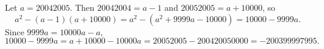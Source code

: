 Let $a=20042005$. Then $20042004=a-1$ and $20052005=a+10000$, so
\[
a^2-(a-1)(a+10000)=a^2-\left(a^2+9999a-10000\right)=10000-9999a .
\]
Since $9999a=10000a-a$,
\[
10000-9999a=a+10000-10000a=20052005-200420050000=\boxed{-200399997995}.
\]
